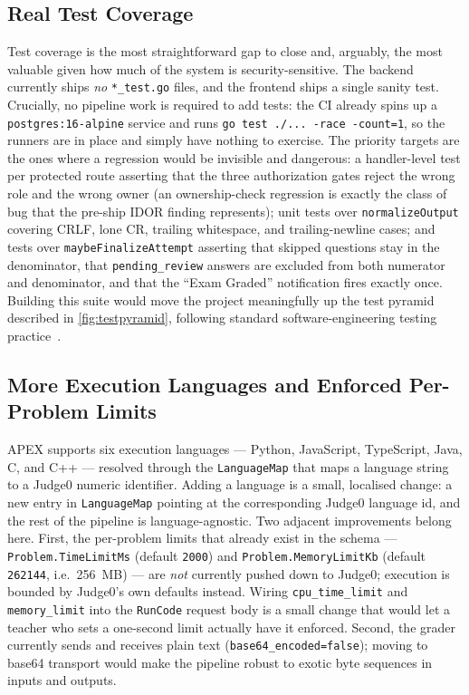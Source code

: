 \subsection{Real Test Coverage}

Test coverage is the most straightforward gap to close and, arguably, the most
valuable given how much of the system is security-sensitive. The backend
currently ships \emph{no} \texttt{*\_test.go} files, and the frontend ships a
single sanity test. Crucially, no pipeline work is required to add tests: the CI
already spins up a \texttt{postgres:16-alpine} service and runs
\texttt{go test ./... -race -count=1}, so the runners are in place and simply
have nothing to exercise. The priority targets are the ones where a regression
would be invisible and dangerous: a handler-level test per protected route
asserting that the three authorization gates reject the wrong role and the wrong
owner (an ownership-check regression is exactly the class of bug that the
pre-ship IDOR finding represents); unit tests over \texttt{normalizeOutput}
covering CRLF, lone CR, trailing whitespace, and trailing-newline cases; and
tests over \texttt{maybeFinalizeAttempt} asserting that skipped questions stay
in the denominator, that \texttt{pending\_review} answers are excluded from both
numerator and denominator, and that the ``Exam Graded'' notification fires
exactly once. Building this suite would move the project meaningfully up the
test pyramid described in \cref{fig:testpyramid}, following standard
software-engineering testing practice~\cite{sommerville-se,pressman-se}.

\subsection{More Execution Languages and Enforced Per-Problem Limits}

APEX supports six execution languages --- Python, JavaScript, TypeScript, Java,
C, and C++ --- resolved through the \texttt{LanguageMap} that maps a language
string to a Judge0 numeric identifier. Adding a language is a small, localised
change: a new entry in \texttt{LanguageMap} pointing at the corresponding Judge0
language id, and the rest of the pipeline is language-agnostic. Two adjacent
improvements belong here. First, the per-problem limits that already exist in
the schema --- \texttt{Problem.TimeLimitMs} (default \texttt{2000}) and
\texttt{Problem.MemoryLimitKb} (default \texttt{262144}, i.e.\ 256~MB) --- are
\emph{not} currently pushed down to Judge0; execution is bounded by Judge0's own
defaults instead. Wiring \texttt{cpu\_time\_limit} and \texttt{memory\_limit}
into the \texttt{RunCode} request body is a small change that would let a teacher
who sets a one-second limit actually have it enforced. Second, the grader
currently sends and receives plain text (\texttt{base64\_encoded=false}); moving
to base64 transport would make the pipeline robust to exotic byte sequences in
inputs and outputs.

